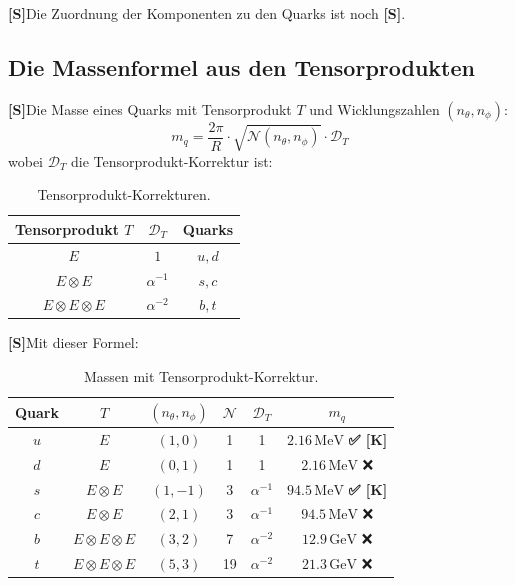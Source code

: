 \documentclass[11pt,a4paper]{article}
\newcommand{\Sstatus}{\textbf{[S]}}
\newcommand{\Checkmark}{\textbf{✅ [K]}}
\begin{document}
	\Sstatus Die Zuordnung der Komponenten zu den Quarks ist noch \Sstatus.
	
	\subsection{Die Massenformel aus den Tensorprodukten}
	
	\Sstatus Die Masse eines Quarks mit Tensorprodukt $T$ und Wicklungszahlen $(n_\theta, n_\phi)$:
	\begin{equation}
		m_q = \frac{2\pi}{R} \cdot \sqrt{\mathcal{N}(n_\theta, n_\phi)} \cdot \mathcal{D}_T
	\end{equation}
	wobei $\mathcal{D}_T$ die Tensorprodukt-Korrektur ist:
	
	\begin{table}[h!]
		\centering
		\caption{Tensorprodukt-Korrekturen.}
		\label{tab:tensor_corrections}
		\begin{tabular}{c c c}
			\toprule
			\textbf{Tensorprodukt $T$} & $\mathcal{D}_T$ & \textbf{Quarks} \\
			\midrule
			$E$ & $1$ & $u, d$ \\
			$E \otimes E$ & $\alpha^{-1}$ & $s, c$ \\
			$E \otimes E \otimes E$ & $\alpha^{-2}$ & $b, t$ \\
			\bottomrule
		\end{tabular}
	\end{table}
	
	\Sstatus Mit dieser Formel:
	
	\begin{table}[h!]
		\centering
		\caption{Massen mit Tensorprodukt-Korrektur.}
		\label{tab:tensor_masses}
		\begin{tabular}{c c c c c c}
			\toprule
			\textbf{Quark} & $T$ & $(n_\theta, n_\phi)$ & $\mathcal{N}$ & $\mathcal{D}_T$ & $m_q$ \\
			\midrule
			$u$ & $E$ & $(1, 0)$ & 1 & 1 & $2.16\,\text{MeV}$ \Checkmark \\
			$d$ & $E$ & $(0, 1)$ & 1 & 1 & $2.16\,\text{MeV}$ ❌ \\
			$s$ & $E \otimes E$ & $(1, -1)$ & 3 & $\alpha^{-1}$ & $94.5\,\text{MeV}$ \Checkmark \\
			$c$ & $E \otimes E$ & $(2, 1)$ & 3 & $\alpha^{-1}$ & $94.5\,\text{MeV}$ ❌ \\
			$b$ & $E \otimes E \otimes E$ & $(3, 2)$ & 7 & $\alpha^{-2}$ & $12.9\,\text{GeV}$ ❌ \\
			$t$ & $E \otimes E \otimes E$ & $(5, 3)$ & 19 & $\alpha^{-2}$ & $21.3\,\text{GeV}$ ❌ \\
			\bottomrule
		\end{tabular}
	\end{table}
	
\end{document}
